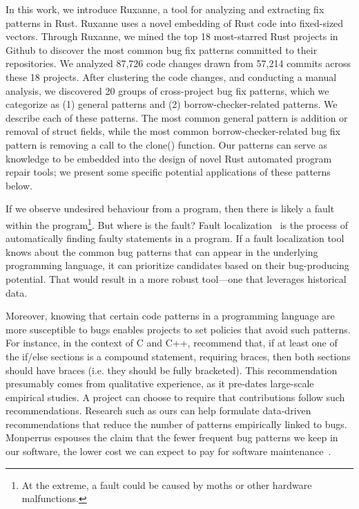 In this work, we introduce Ruxanne, a tool for analyzing and extracting fix patterns in Rust. Ruxanne uses a novel embedding of Rust code into fixed-sized vectors. Through Ruxanne, we mined the top 18 most-starred Rust projects in Github to discover the most common bug fix patterns committed to their repositories. We analyzed 87,726 code changes drawn from 57,214 commits across these 18 projects. After clustering the code changes, and conducting a manual analysis, we discovered 20 groups of cross-project bug fix patterns, which we categorize as (1) general patterns and (2) borrow-checker-related patterns. We describe each of these patterns. The most common general pattern is addition or removal of struct fields, while the most common borrow-checker-related bug fix pattern is removing a call to the clone() function. Our patterns can serve as knowledge to be embedded into the design of novel Rust automated program repair tools; we present some specific potential applications of these patterns below.

If we observe undesired behaviour from a program, then there is likely a fault within the program\footnote{At the extreme, a fault could be caused by moths or other hardware malfunctions.}. But where is the fault? Fault localization~\citep{wong2016survey} is the process of automatically finding faulty statements in a program. If a fault localization tool knows about the common bug patterns that can appear in the underlying programming language, it can prioritize candidates based on their bug-producing potential. That would result in a more robust tool---one that leverages historical data.

Moreover, knowing that certain code patterns in a programming language are more susceptible to bugs enables projects to set policies that avoid such patterns. For instance, in the context of C and C++, \cite{Cannon1997RecommendedCS} recommend that, if at least one of the if/else sections is a compound statement, requiring braces, then both sections should have braces (i.e. they should be fully bracketed). This recommendation presumably comes from qualitative experience, as it pre-dates large-scale empirical studies. A project can choose to require that contributions follow such recommendations. Research such as ours can help formulate data-driven recommendations that reduce the number of patterns empirically linked to bugs. Monperrus espouses the claim that the fewer frequent bug patterns we keep in our software, the lower cost we can expect to pay for software maintenance~\citep{monperrus2014critical}.

